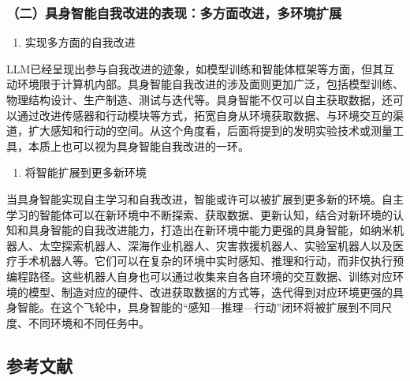 \hypertarget{ux4e8cux5177ux8eabux667aux80fdux81eaux6211ux6539ux8fdbux7684ux8868ux73b0ux591aux65b9ux9762ux6539ux8fdbux591aux73afux5883ux6269ux5c55}{%
\subsubsection{（二）具身智能自我改进的表现：多方面改进，多环境扩展}\label{ux4e8cux5177ux8eabux667aux80fdux81eaux6211ux6539ux8fdbux7684ux8868ux73b0ux591aux65b9ux9762ux6539ux8fdbux591aux73afux5883ux6269ux5c55}}

\begin{enumerate}
\def\labelenumi{\arabic{enumi}.}
\tightlist
\item
  实现多方面的自我改进
\end{enumerate}

LLM已经呈现出参与自我改进的迹象，如模型训练和智能体框架等方面，但其互动环境限于计算机内部。具身智能自我改进的涉及面则更加广泛，包括模型训练、物理结构设计、生产制造、测试与迭代等。具身智能不仅可以自主获取数据，还可以通过改进传感器和行动模块等方式，拓宽自身从环境获取数据、与环境交互的渠道，扩大感知和行动的空间。从这个角度看，后面将提到的发明实验技术或测量工具，本质上也可以视为具身智能自我改进的一环。

\begin{enumerate}
\def\labelenumi{\arabic{enumi}.}
\setcounter{enumi}{1}
\tightlist
\item
  将智能扩展到更多新环境
\end{enumerate}

当具身智能实现自主学习和自我改进，智能或许可以被扩展到更多新的环境。自主学习的智能体可以在新环境中不断探索、获取数据、更新认知，结合对新环境的认知和具身智能的自我改进能力，打造出在新环境中能力更强的具身智能，如纳米机器人、太空探索机器人、深海作业机器人、灾害救援机器人、实验室机器人以及医疗手术机器人等。它们可以在复杂的环境中实时感知、推理和行动，而非仅执行预编程路径。这些机器人自身也可以通过收集来自各自环境的交互数据、训练对应环境的模型、制造对应的硬件、改进获取数据的方式等，迭代得到对应环境更强的具身智能。在这个飞轮中，具身智能的``感知---推理---行动''闭环将被扩展到不同尺度、不同环境和不同任务中。

\FloatBarrier
{}
\hypertarget{ux53c2ux8003ux6587ux732e-166}{%
\subsection{参考文献}\label{ux53c2ux8003ux6587ux732e-166}}

